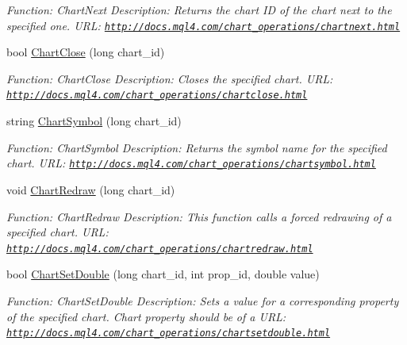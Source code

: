\begin{DoxyCompactItemize}
\begin{DoxyCompactList}\small\item\em Function\+: Chart\+Next Description\+: Returns the chart ID of the chart next to the specified one. U\+RL\+: \href{http://docs.mql4.com/chart_operations/chartnext.html}{\tt http\+://docs.\+mql4.\+com/chart\+\_\+operations/chartnext.\+html} \end{DoxyCompactList}\item 
bool \hyperlink{class_m_q_l4_c_sharp_1_1_base_1_1_m_q_l_base_a6f9f28c2621c46d7ae87324796e293da}{Chart\+Close} (long chart\+\_\+id)
\begin{DoxyCompactList}\small\item\em Function\+: Chart\+Close Description\+: Closes the specified chart. U\+RL\+: \href{http://docs.mql4.com/chart_operations/chartclose.html}{\tt http\+://docs.\+mql4.\+com/chart\+\_\+operations/chartclose.\+html} \end{DoxyCompactList}\item 
string \hyperlink{class_m_q_l4_c_sharp_1_1_base_1_1_m_q_l_base_abbcc4bfeae5b84267cd76e0c084d4a21}{Chart\+Symbol} (long chart\+\_\+id)
\begin{DoxyCompactList}\small\item\em Function\+: Chart\+Symbol Description\+: Returns the symbol name for the specified chart. U\+RL\+: \href{http://docs.mql4.com/chart_operations/chartsymbol.html}{\tt http\+://docs.\+mql4.\+com/chart\+\_\+operations/chartsymbol.\+html} \end{DoxyCompactList}\item 
void \hyperlink{class_m_q_l4_c_sharp_1_1_base_1_1_m_q_l_base_a944d3ccca88ab43d0bac2b7b71abc85c}{Chart\+Redraw} (long chart\+\_\+id)
\begin{DoxyCompactList}\small\item\em Function\+: Chart\+Redraw Description\+: This function calls a forced redrawing of a specified chart. U\+RL\+: \href{http://docs.mql4.com/chart_operations/chartredraw.html}{\tt http\+://docs.\+mql4.\+com/chart\+\_\+operations/chartredraw.\+html} \end{DoxyCompactList}\item 
bool \hyperlink{class_m_q_l4_c_sharp_1_1_base_1_1_m_q_l_base_a2a0327a26fa63403b19ab7370bb76d1e}{Chart\+Set\+Double} (long chart\+\_\+id, int prop\+\_\+id, double value)
\begin{DoxyCompactList}\small\item\em Function\+: Chart\+Set\+Double Description\+: Sets a value for a corresponding property of the specified chart. Chart property should be of a U\+RL\+: \href{http://docs.mql4.com/chart_operations/chartsetdouble.html}{\tt http\+://docs.\+mql4.\+com/chart\+\_\+operations/chartsetdouble.\+html} \end{DoxyCompactList}\item 

\end{DoxyCompactItemize}
